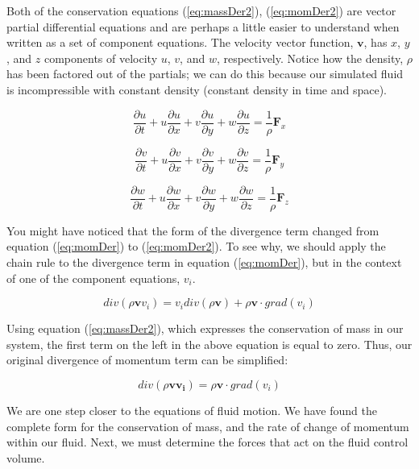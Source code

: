 \documentclass[twocolumn,12pth]{article}
\begin{document}
Both of the conservation equations (\ref{eq:massDer2}), (\ref{eq:momDer2}) are vector partial differential equations and are perhaps a little easier to understand when written as a set of component equations.
The velocity vector function, $\mathbf{v}$, has $x$, $y$, and $z$ components of velocity $u$, $v$, and $w$, respectively.
Notice how the density, $\rho$ has been factored out of the partials; we can do this because our simulated fluid is incompressible with constant density (constant density in time and space).

\begin{equation}
\frac{\partial{u}}{\partial{t}} + u\frac{\partial{u}}{\partial{x}} + v\frac{\partial{u}}{\partial{y}} + w\frac{\partial{u}}{\partial{z}} = \frac{1}{\rho}\mathbf{F}_x
\label{eq:momComps}
\end{equation}

\begin{equation*}
\frac{\partial{v}}{\partial{t}} + u\frac{\partial{v}}{\partial{x}} + v\frac{\partial{v}}{\partial{y}} + w\frac{\partial{v}}{\partial{z}} = \frac{1}{\rho}\mathbf{F}_y
\end{equation*}

\begin{equation*}
\frac{\partial{w}}{\partial{t}} + u\frac{\partial{w}}{\partial{x}} + v\frac{\partial{w}}{\partial{y}} + w\frac{\partial{w}}{\partial{z}} = \frac{1}{\rho}\mathbf{F}_z
\end{equation*}

You might have noticed that the form of the divergence term changed from equation (\ref{eq:momDer}) to (\ref{eq:momDer2}).
To see why, we should apply the chain rule to the divergence term in equation (\ref{eq:momDer}), but in the context of one of the component equations, $v_i$. \cite{Ferziger2002}

\begin{equation}
div(\rho \mathbf{v}v_i) = v_i div(\rho\mathbf{v}) + \rho\mathbf{v} \cdot grad(v_i)
\end{equation}

Using equation (\ref{eq:massDer2}), which expresses the conservation of mass in our system, the first term on the left in the above equation is equal to zero.
Thus, our original divergence of momentum term can be simplified:

\begin{equation}
div(\rho \mathbf{vv_i}) = \rho\mathbf{v} \cdot grad(v_i)
\end{equation}

We are one step closer to the equations of fluid motion.
We have found the complete form for the conservation of mass, and the rate of change of momentum within our fluid.
Next, we must determine the forces that act on the fluid control volume.
\end{document}
